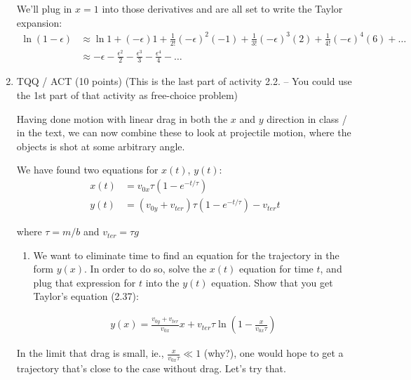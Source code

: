 \documentclass[12pt]{article}
\begin{document}
\begin{enumerate}
{        We'll plug in $x = 1$ into those derivatives and are all set to write the Taylor expansion:
        \begin{align*}
            \ln(1-\epsilon) &\approx \ln 1 + (- \epsilon)1 + \frac{1}{2!}(-\epsilon)^2(-1) + \frac{1}{3!}(-\epsilon)^3(2)
            + \frac{1}{4!}(-\epsilon)^4(6) + \ldots\\
&\approx -\epsilon - \frac{\epsilon^2}{2} - \frac{\epsilon^3}{3} - \frac{\epsilon^4}{4} - \ldots
        \end{align*}
    }

    \item TQQ / ACT (10 points) (This is the last part of activity 2.2.  -- You could use the 1st part of that activity as free-choice problem)

    Having done motion with linear drag in both the $x$ and $y$ direction in class / in the text, we can now combine these to look at projectile motion, where the objects is shot at some arbitrary angle.

    We have found two equations for $x(t)$, $y(t)$:
    \begin{align}
        x(t) &= v_{0x} \tau \left(1 - e^{-t/\tau}\right)\\
        y(t) &= (v_{0y} + v_{ter}) \tau \left(1 - e^{-t/\tau}\right) - v_{ter} t
    \end{align}

    where $\tau = m / b$ and $v_{ter} = \tau g$

    \begin{enumerate}
      \item We want to eliminate time to find an equation for the trajectory in the form $y(x)$. In order to do so, solve the $x(t)$ equation for time $t$, and plug that expression for $t$ into the $y(t)$ equation. Show that you get Taylor's equation (2.37):

      \begin{align}
y(x) = \frac{v_{0y} + v_{ter}}{v_{0x}} x + v_{ter}\tau\ln\left(1-\frac{x}{v_{0x}\tau}\right)
      \end{align}
    \end{enumerate}

      In the limit that drag is small, ie., $\frac{x}{v_{0x}\tau} \ll 1$ (why?), one would hope to get a trajectory that's close to the case without drag. Let's try that.



\end{enumerate}
\end{document}
